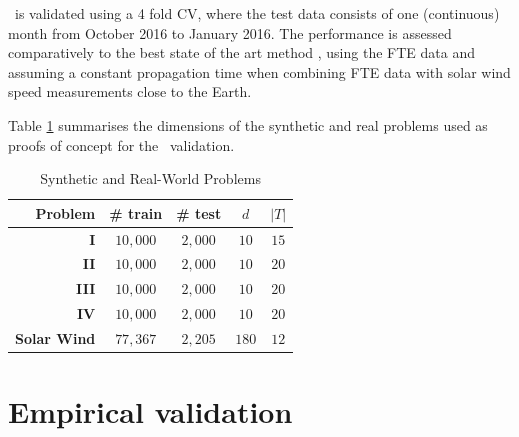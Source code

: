 \XX\ is validated using a 4 fold CV, where the test data consists of one (continuous) month from October 2016 to January 2016. The performance is assessed comparatively to the best state of the art method \citep{Poduval_2014,neuralnetsw}, using  the FTE data and assuming a constant propagation time when combining FTE data with solar wind speed measurements close to the Earth. 

Table \ref{tab:exp_data_info} summarises the dimensions of the synthetic and real problems used as proofs of concept for the \XX\ validation.
\begin{table}[htbp]
  \caption{Synthetic and Real-World Problems}\label{tab:exp_data_info}
  \centering
  \begin{tabular}{ r c c c c}
  \hline
  Problem &  \# train & \# test & $d$ & $|T|$ \\
  \hline
  \textbf{I} & $10,000$ & $2,000$  & $10$ & $15$\\
  \textbf{II} & $10,000$ & $2,000$ & $10$ & $20$\\
  \textbf{III} & $10,000$ & $2,000$ & $10$ & $20$\\
  \textbf{IV} & $10,000$ & $2,000$ & $10$ & $20$\\
  \textbf{Solar Wind} & $77,367$ & $2,205$ & $180$ & $12$\\
  \hline
  \end{tabular}
\end{table}

\section{Empirical validation}\label{sec:proofconcept}

